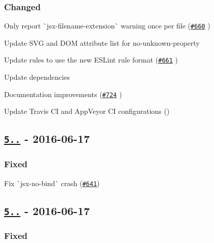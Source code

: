 \subsubsection*{Changed}


\begin{DoxyItemize}
\item Only report \`{}jsx-\/filename-\/extension\`{} warning once per file (\href{https://github.com/yannickcr/eslint-plugin-react/pull/660}{\tt \#660} )
\item Update S\+VG and D\+OM attribute list for {\ttfamily no-\/unknown-\/property}
\item Update rules to use the new E\+S\+Lint rule format (\href{https://github.com/yannickcr/eslint-plugin-react/issues/661}{\tt \#661} )
\item Update dependencies
\item Documentation improvements (\href{https://github.com/yannickcr/eslint-plugin-react/pull/724}{\tt \#724} )
\item Update Travis CI and App\+Veyor CI configurations ()
\end{DoxyItemize}

\subsection*{\href{https://github.com/yannickcr/eslint-plugin-react/compare/v5.2.1...v5.2.2}{\tt 5..} -\/ 2016-\/06-\/17}

\subsubsection*{Fixed}


\begin{DoxyItemize}
\item Fix \`{}jsx-\/no-\/bind\`{} crash (\href{https://github.com/yannickcr/eslint-plugin-react/issues/641}{\tt \#641})
\end{DoxyItemize}

\subsection*{\href{https://github.com/yannickcr/eslint-plugin-react/compare/v5.2.0...v5.2.1}{\tt 5..} -\/ 2016-\/06-\/17}

\subsubsection*{Fixed}


